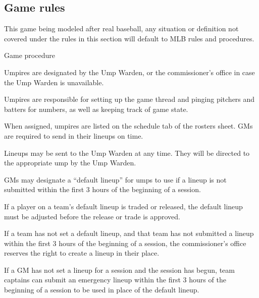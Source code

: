 
\subsection{Game rules}
\label{sec:game rules}
\begin{deepEnumerate}
	\item This game being modeled after real baseball, 
	any situation or definition not covered under the rules in this section 
	will default to MLB rules and procedures.
	\item Game procedure
	\begin{deepEnumerate}
		\item Umpires are designated by the Ump Warden, 
		or the commissioner’s office in case the Ump Warden is unavailable.
		\begin{deepEnumerate}
			\item Umpires are responsible for setting up the game thread 
			and pinging pitchers and batters for numbers, 
			as well as keeping track of game state.
			\item When assigned, umpires are listed on the schedule tab of the rosters sheet. 
			GMs are required to send in their lineups on time.
			\begin{deepEnumerate}
				\item Lineups may be sent to the Ump Warden at any time. 
				They will be directed to the appropriate ump by the Ump Warden.
				\item GMs may designate a “default lineup” for umps to use 
				if a lineup is not submitted within the first 3 hours of the beginning of a session.
				\begin{deepEnumerate}
					\item If a player on a team’s default lineup is traded or released, 
					the default lineup must be adjusted before the release or trade is approved.
					\item If a team has not set a default lineup, 
					and that team has not submitted a lineup within the first 3 hours of the beginning of a session, 
					the commissioner’s office reserves the right to create a lineup in their place.
					\item If a GM has not set a lineup for a session and the session has begun, 
					\label{sec:captain lineups}
					team captains can submit an emergency lineup within the first 3 hours of the beginning of a session 
					to be used in place of the default lineup.
					\begin{deepEnumerate}

\end{deepEnumerate}
\end{deepEnumerate}
\end{deepEnumerate}
\end{deepEnumerate}
\end{deepEnumerate}
\end{deepEnumerate}
